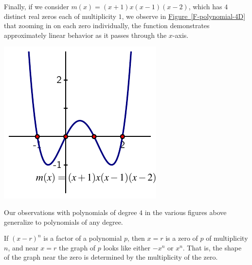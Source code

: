 \documentclass{ximera}
\begin{document}
Finally, if we consider $m(x) = (x+1)x(x-1)(x-2)$, which has $4$ distinct real zeros each of multiplicity $1$, we observe in \hyperref[F-polynomial-4D]{Figure~\ref{F-polynomial-4D}} that zooming in on each zero individually, the function demonstrates approximately linear behavior as it passes through the $x$-axis.%

\begin{image}
\includegraphics[width=0.5\linewidth]{images/polynomial-1-1-1-1.pdf}
\end{image}

Our observations with polynomials of degree $4$ in the various figures above generalize to polynomials of any degree.%


If $(x-r)^n$ is a factor of a polynomial $p$, then $x = r$ is a zero of $p$ of multiplicity $n$, and near $x = r$ the graph of $p$ looks like either $-x^n$ or $x^n$.  That is, the shape of the graph near the zero is determined by the multiplicity of the zero.%
\end{document}
